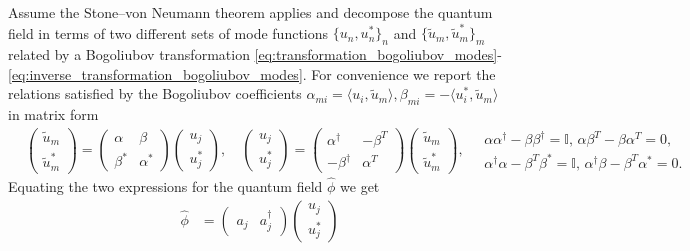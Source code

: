 \documentclass[../QFT_main.tex]{subfiles}
\begin{document}
\begin{mytheorem}
Assume the Stone--von Neumann theorem applies and decompose the quantum field in terms of two different sets of mode functions $\{u_n, u_n^*\}_n$ and $\{\tilde{u}_m, \tilde{u}_m^*\}_m$ related by a Bogoliubov transformation \eqref{eq:transformation_bogoliubov_modes}-\eqref{eq:inverse_transformation_bogoliubov_modes}.
For convenience we report the relations satisfied by the Bogoliubov coefficients $\alpha_{mi}=\langle u_i, \tilde{u}_m\rangle, \beta_{mi} = -\langle u_i^*, \tilde{u}_m\rangle$ in matrix form
{\small\begin{align}\label{eq:bogol_transform_mode_function_matrix_form_quantum}
    &\begin{pmatrix}\tilde{u}_m\\ \tilde{u}_m^*\end{pmatrix}
    = \begin{pmatrix}\alpha & \beta\\\beta^* & \alpha^* \end{pmatrix}
    \begin{pmatrix}u_j\\ u_j^*\end{pmatrix},\quad
    \begin{pmatrix}u_j\\u_j^*\end{pmatrix}
    = \begin{pmatrix}\alpha^\dagger & -\beta^T\\-\beta^\dagger & \alpha^T \end{pmatrix}
    \begin{pmatrix}\tilde{u}_m\\ \tilde{u}_m^*\end{pmatrix},
    \quad \begin{array}{c} \alpha\alpha^\dagger - \beta \beta^\dagger = \mathbb{I},\, \alpha\beta^T - \beta\alpha^T = 0, \\[2.5pt]
    \alpha^\dagger \alpha - \beta^T \beta^* = \mathbb{I},\, \alpha^\dagger \beta - \beta^T \alpha^* = 0.
    \end{array}
\end{align}}
Equating the two expressions for the quantum field $\hat{\phi}$ we get
{\small\begin{align}
    \hat{\phi} &= \begin{pmatrix}a_j & a_j^\dagger\end{pmatrix}
    \begin{pmatrix} u_j\\ u_j^*\end{pmatrix}

\end{align}}
\end{mytheorem}
\end{document}
